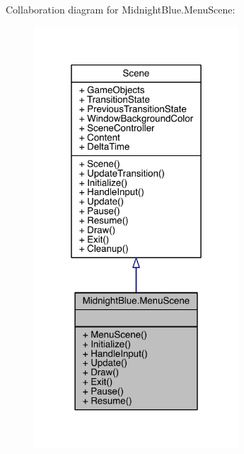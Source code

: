 Collaboration diagram for Midnight\+Blue.\+Menu\+Scene\+:
\nopagebreak
\begin{figure}[H]
\begin{center}
\leavevmode
\includegraphics[width=217pt]{class_midnight_blue_1_1_menu_scene__coll__graph}
\end{center}
\end{figure}
